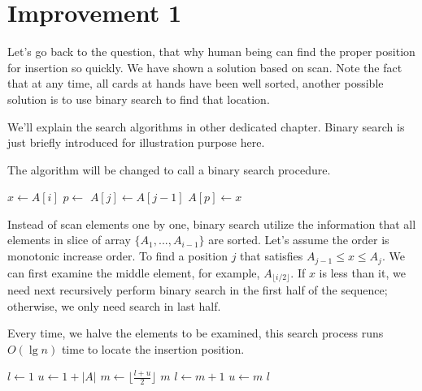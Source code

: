 \documentclass{article}
\begin{document}

\section{Improvement 1}

Let's go back to the question, that why human being can find the proper
position for insertion so quickly. We have shown a solution based on scan.
Note the fact that at any time, all cards at hands have been well sorted,
another possible solution is to use binary search to find that location.

We'll explain the search algorithms in other dedicated chapter. Binary
search is just briefly introduced for illustration purpose here.

The algorithm will be changed to call a binary search procedure.

\begin{algorithmic}
    \State $x \gets A[i]$
    \State $p \gets $ 
      \State $A[j] \gets A[j-1]$
    \EndFor
    \State $A[p] \gets x$
  \EndFor
\EndFunction
\end{algorithmic}

Instead of scan elements one by one, binary search utilize the information
that all elements in slice of array $\{A_1, ..., A_{i-1} \}$ are sorted.
Let's assume
the order is monotonic increase order. To find a position $j$ that satisfies
$A_{j-1} \leq x \leq A_{j}$. We can first examine the middle element, for
example, $A_{\lfloor i/2 \rfloor}$. If $x$ is less than it, we need next recursively
perform binary search in the first half of the sequence; otherwise, we
only need search in last half.

Every time, we halve the elements to be examined, this search process runs
$O(\lg n)$ time to locate the insertion position.

\begin{algorithmic}
  \State $l \gets 1$
  \State $u \gets 1+|A|$
    \State $m \gets \lfloor \frac{l+u}{2} \rfloor$
      \State \Return $m$ 
      \State $l \gets m+1$
    \Else
      \State $u \gets m$
    \EndIf
  \EndWhile
  \State \Return $l$
\EndFunction
\end{algorithmic}
\end{document}
